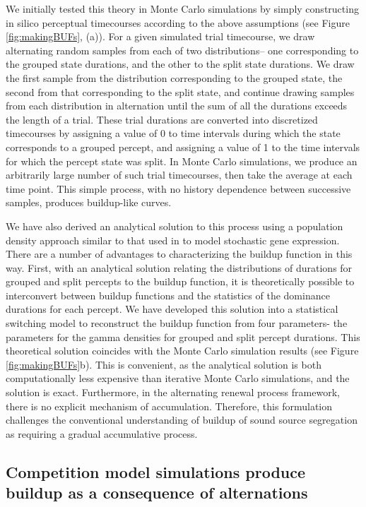 \documentclass{frontiersSCNS} %
\begin{document}
We initially tested this theory in Monte Carlo simulations by simply constructing in silico perceptual timecourses according to the above assumptions (see Figure \ref{fig:makingBUFs}, (a)). For a given simulated trial timecourse, we draw alternating random samples from each of two distributions-- one corresponding to the grouped state durations, and the other to the split state durations. We draw the first sample from the distribution corresponding to the grouped state, the second from that corresponding to the split state, and continue drawing samples from each distribution in alternation until the sum of all the durations exceeds the length of a trial. These trial durations are converted into discretized timecourses by assigning a value of 0 to time intervals during which the state corresponds to a grouped percept, and assigning a value of 1 to the time intervals for which the percept state was split. In Monte Carlo simulations, we produce an arbitrarily large number of such trial timecourses, then take the average at each time point. This simple process, with no history dependence between successive samples, produces buildup-like curves.

We have also derived an analytical solution to this process using a population density approach similar to that used in \cite{Stinchcombe2012} to model stochastic gene expression. There are a number of advantages to characterizing the buildup function in this way. First, with an analytical solution relating the distributions of durations for grouped and split percepts to the buildup function, it is theoretically possible to interconvert between buildup functions and the statistics of the dominance durations for each percept. We have developed this solution into a statistical switching model to reconstruct the buildup function from four parameters- the parameters for the gamma densities for grouped and split percept durations. This theoretical solution coincides with the Monte Carlo simulation results  (see Figure \ref{fig:makingBUFs}b). This is convenient, as the analytical solution is both computationally less expensive than iterative Monte Carlo simulations, and the solution is exact. Furthermore, in the alternating renewal process framework, there is no explicit mechanism of accumulation. Therefore, this formulation challenges the conventional understanding of buildup of sound source segregation as requiring a gradual accumulative process.

\subsection{Competition model simulations produce buildup as a consequence of alternations} 
\end{document}
